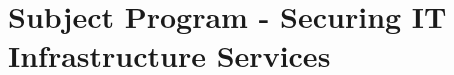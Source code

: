 \chapter{Subject Program - Securing IT Infrastructure Services}
\label{appendix:SubjecProgram}




%
